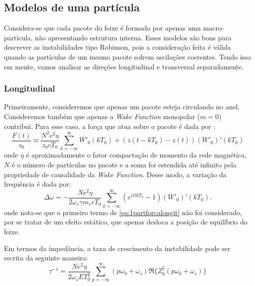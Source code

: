 \subsection{Modelos de uma partícula}

Considera-se que cada pacote do feixe é formado por apenas uma macro-partícula, não apresentando estrutura interna. Esses modelos são bons para descrever as instabilidades tipo Robinson, pois a consideração feita é válida quando as partículas de um mesmo pacote sofrem oscilações coerentes. Tendo isso em mente, vamos analisar as direções longitudinal e transversal separadamente.

\subsubsection{Longitudinal}

Primeiramente, consideremos que apenas um pacote esteja circulando no anel. Consideremos também que apenas a \textit{Wake Function} monopolar ($m=0$) contribui. Para esse caso, a força que atua sobre o pacote é dada por \cite{Chao}:
\begin{equation}\label{eq:1partforcalongit}
 \frac{F(t)}{z_0} \approx \frac{N^2 e^2 \eta}{z_0cT_0}\sum^\infty_{k=-\infty}
 W'_0 (kT_0) + (z(t-kT_0)-z(t))(W'_0)'(kT_0)
\end{equation}
onde $\eta$ é aproximadamente o fator compactação de momento da rede magnética, $N$ é o número de partículas no pacote e a soma foi estendida até infinito pela propriedade de causalidade da \textit{Wake Function}. Desse modo, a variação da frequência é dada por:
\begin{equation}
 \Delta \omega = -\frac{Ne^2 \eta}{2\omega_s\gamma m_e c T_0}
\sum^\infty_{k=-\infty} \left(e^{i\Omega k T_0}-1\right)(W'_0)'(kT_0).
\end{equation}
onde nota-se que o primeiro termo de \eqref{eq:1partforcalongit} não foi considerado, por se tratar de um efeito estático, que apenas desloca a posição de equilíbrio do feixe.

Em termos da impedância, a taxa de crescimento da instabilidade pode ser escrita da seguinte maneira:
\begin{equation}\label{long1b}
 \tau^{-1}=\frac{Ne^2 \eta}{2\omega_s E T_0^2} \sum^\infty_{p=-\infty}
(p\omega_0+\omega_s)\Re \{Z^\lVert_0(p\omega_0+\omega_s)\}
\end{equation}

